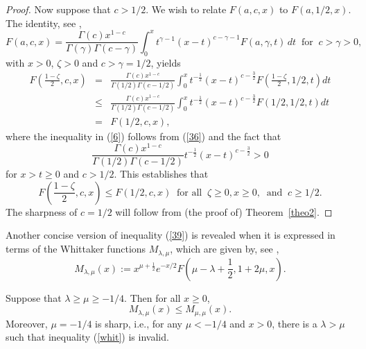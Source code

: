 \begin{proof}
Now suppose that $c>1/2$. We wish to relate $F(a,c,x)$ to $F(a,1/2,x)$.
The identity, see \cite[p. 863, \#7.613-1]{GR},
\[
F(a,c,x)=\frac{\Gamma(c)x^{1-c}}{\Gamma(\gamma)\Gamma(c-\gamma)}
\int_0^x t^{\gamma-1}(x-t)^{c-\gamma-1} F(a,\gamma,t)\,dt\;\;
\mbox{for}\;\; c>\gamma>0,
\]
with $x>0$, $\zeta>0$ and $c>\gamma=1/2$, yields
\begin{eqnarray}
\nonumber
F\left(\frac{1-\zeta}{2},c,x\right)
& = & \frac{\Gamma(c)x^{1-c}}{\Gamma(1/2)\Gamma(c-1/2)}
\int_0^x t^{-\frac{1}{2}}(x-t)^{c-\frac{3}{2}}
F\left(\frac{1-\zeta}{2},1/2,t\right) dt \\[1ex]
\label{6}
& \leq & \frac{\Gamma(c)x^{1-c}}{\Gamma(1/2)\Gamma(c-1/2)}
\int_0^x t^{-\frac{1}{2}}(x-t)^{c-\frac{3}{2}}
F(1/2,1/2,t) dt \\[1ex]
\nonumber
& = & F(1/2,c,x),
\end{eqnarray}
where the inequality in (\ref{6}) follows from (\ref{36}) and the fact that
$$
\frac{\Gamma(c)x^{1-c}}{\Gamma(1/2)\Gamma(c-1/2)} t^{-\frac{1}{2}}
(x-t)^{c-\frac{3}{2}}>0
$$
for $x>t\geq 0$ and $c>1/2$. This establishes that
\begin{equation}\label{39}
F\left(\frac{1-\zeta}{2},c,x\right)\leq F(1/2,c,x)\;\; \mbox{for
all}\;\; \zeta\geq 0,x\geq 0,\;\; \mbox{and}\;\; c\geq 1/2.
\end{equation}
The sharpness of $c=1/2$ will follow from (the proof of) Theorem~\ref{theo2}.
\end{proof}

Another concise version of inequality (\ref{39}) is revealed when
it is expressed in terms of the Whittaker functions $M_{\lambda,\mu}$,
which are given by, see \cite[p.\ 1087, \#9.220-2]{GR},
\[
M_{\lambda,\mu}(x):=x^{\mu+\frac{1}{2}} e^{-x/2} F
\left(\mu-\lambda+\frac{1}{2},1+2\mu,x\right).
\]

\begin{theorem}\label{theo2} Suppose that $\lambda\geq\mu\geq-1/4$.
Then for all $x\geq 0$,
\begin{equation}\label{whit}
M_{\lambda,\mu}(x)\leq M_{\mu,\mu}(x).
\end{equation}
Moreover, $\mu=-1/4$ is sharp, i.e., for any $\mu<-1/4$ and $x>0$,
there is a $\lambda>\mu$ such that inequality (\ref{whit}) is invalid.
\end{theorem}

